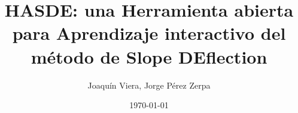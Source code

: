 \documentclass[a4paper,10pt]{article}
\begin{document}
 


\title{HASDE: una Herramienta abierta para Aprendizaje interactivo del método de Slope DEflection}
\author{Joaquín Viera, Jorge Pérez Zerpa}
\date{\today}
\maketitle



\end{document}
